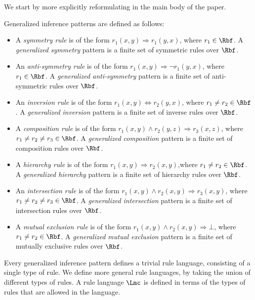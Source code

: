 \documentclass{article}
\begin{document}
We start by more explicitly reformulating  in the main body of the paper.
\begin{definition} Generalized inference patterns are defined as follows:
\begin{itemize}
\item A \emph{symmetry rule} is of the form $r_1(x,y) \Rightarrow r_1(y,x)$, where $r_1 \in \Rbf$. A \emph{generalized symmetry} pattern is a finite set of symmetric rules over $\Rbf$.

\item An \emph{anti-symmetry rule} is of the form $r_1(x,y) \Rightarrow \neg r_1(y,x)$, where $r_1 \in \Rbf$. A \emph{generalized anti-symmetry} pattern is a finite set of anti-symmetric rules over $\Rbf$.

\item An \emph{inversion rule} is of the form $r_1(x,y) \Leftrightarrow r_2(y,x)$, where $r_1 \neq r_2 \in \Rbf$. A \emph{generalized inversion} pattern is a finite set of inverse rules over $\Rbf$.

\item A \emph{composition rule} is of the form $r_1(x,y) \land r_2(y,z) \Rightarrow r_3(x,z)$, where $r_1\neq r_2 \neq r_3 \in \Rbf$.  A \emph{generalized composition} pattern is a finite set of composition rules over  $\Rbf$.

\item A \emph{hierarchy rule} is of the form $r_1(x,y) \Rightarrow r_2(x,y)$,where $r_1 \neq r_2 \in \Rbf$. A \emph{generalized hierarchy} pattern is a finite set of hierarchy rules over $\Rbf$.

\item An \emph{intersection rule} is of the form $r_1(x,y) \land r_2(x,y) \Rightarrow r_3(x,y)$,  where $r_1 \neq r_2 \neq r_3 \in \Rbf$.  A \emph{generalized intersection} pattern is a finite set of intersection rules over $\Rbf$.

\item A \emph{mutual exclusion rule} is of the form $r_1(x,y) \land  r_2(x,y) \Rightarrow  \bot$,  where $r_1 \neq r_2 \in \Rbf$.  A \emph{generalized mutual exclusion} pattern is a finite set of mutually exclusive rules over $\Rbf$.
\end{itemize} 
Every generalized inference pattern defines a trivial rule language, consisting of a single type of rule.
We define more general rule languages, by taking the union of different types of rules.
A rule language $\Lmc$ is defined in terms of the types of rules that are allowed in the language.
\end{definition}
\end{document}
